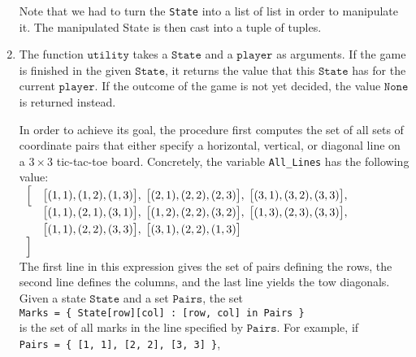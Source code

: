\begin{enumerate}
      Note that we had to turn the \texttt{State} into a list of list in order to manipulate it.
      The manipulated State is then cast into a tuple of tuples.
\item The function $\texttt{utility}$ takes a $\texttt{State}$ and a $\texttt{player}$ as arguments.  If the game is 
      finished in the given $\texttt{State}$, it returns the value that this $\texttt{State}$ has for the
      current $\texttt{player}$.  If the outcome of the game is not yet decided, the value $\mathtt{None}$
      is returned instead. 
 
      In order to achieve its goal, the procedure first computes the set of all sets of coordinate pairs that 
      either specify a horizontal, vertical, or diagonal line on a $3 \times 3$ tic-tac-toe board.  Concretely,
      the variable \texttt{All\_Lines} has the following value:
      \\[0.2cm]
      \hspace*{1.3cm}
      $
      \begin{array}{ll}
       \Bigl[ & \bigl[(1, 1), (1, 2), (1, 3)\bigr], \;
                \bigl[(2, 1), (2, 2), (2, 3)\bigr], \;
                \bigl[(3, 1), (3, 2), (3, 3)\bigr],   \\[0.1cm]
              & \bigl[(1, 1), (2, 1), (3, 1)\bigr], \;
                \bigl[(1, 2), (2, 2), (3, 2)\bigr], \;
                \bigl[(1, 3), (2, 3), (3, 3)\bigr],   \\[0.1cm]
              & \bigl[(1, 1), (2, 2), (3, 3)\bigr], \;
                \bigl[(3, 1), (2, 2), (1, 3)\bigr]    \\
       \Bigr]
      \end{array}
      $
      \\[0.2cm]
      The first line in this expression gives the set of pairs defining the rows, the second line defines 
      the columns, and the last line yields the tow diagonals.  Given a state $\texttt{State}$ and a set
      $\texttt{Pairs}$, the set 
      \\[0.2cm]
      \hspace*{1.3cm}
      \texttt{Marks = \{ State[row][col] : [row, col] in Pairs \}}
      \\[0.2cm]
      is the set of all marks in the line specified by $\texttt{Pairs}$.  For example, if 
      \\[0.2cm]
      \hspace*{1.3cm}
      \texttt{Pairs = \{ [1, 1], [2, 2], [3, 3] \}},
      \\[0.2cm]

\end{enumerate}
